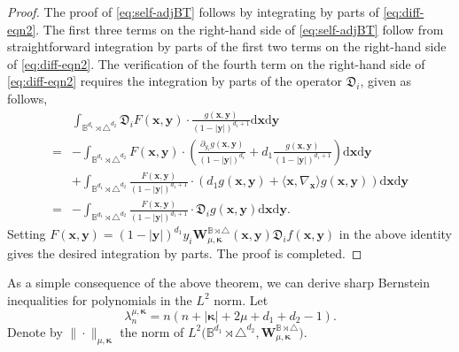 \documentclass{amsart}
\theoremstyle{remark}
\def\la{{\langle}}
\def\ra{{\rangle}}
\def\d{\mathrm{d}}
\def\fD{{\mathfrak D}}
\def\l{{\lambda}}
\def\la{{\langle}}
\def\ra{{\rangle}}
\def\BB{{\mathbb B}}
\def\VV{{\mathbb V}}
\def\bk{{\boldsymbol{\kappa}}}
\begin{document}
\begin{proof}
The proof of \eqref{eq:self-adjBT} follows by integrating by parts of \eqref{eq:diff-eqn2}. The first three terms on the right-hand side 
of \eqref{eq:self-adjBT} follow from straightforward integration by parts of the first two terms on the right-hand side of \eqref{eq:diff-eqn2}.
The verification of the fourth term on the right-hand side of \eqref{eq:diff-eqn2} requires the integration by parts of the 
operator $\fD_i$, given as follows, 
\begin{align*} 
 & \int_{\BB^{d_1} \rtimes \triangle^{d_2}}\fD_i F(\bm x,\bm y) \cdot \frac{g(\bm x,\bm y)}{(1-|\bm y|)^{d_1+1}} \d \bm x \d \bm y \\
  = & -   \int_{\BB^{d_1} \rtimes \triangle^{d_2}} F(\bm x,\bm y) \cdot \left (\frac{\partial_{y_i} g(\bm x,\bm y)}{(1-|\bm y|)^{d_1}} 
       + d_1 \frac{g(\bm x,\bm y)}{(1-|\bm y|)^{d_1+1}} \right)  \d \bm x \d \bm y  \\
 &  + \int_{\BB^{d_1} \rtimes \triangle^{d_2}} \frac{F(\bm x,\bm y)}{(1-|\bm y|)^{d_1+1}} \cdot \left (d_1 g(\bm x,\bm y) 
      + \la \bm x, \nabla_{\bm x}\ra g(\bm x,\bm y) \right)  \d \bm x \d \bm y  \\
  = & - \int_{\BB^{d_1} \rtimes \triangle^{d_2}} \frac{F(\bm x,\bm y)}{(1-|\bm y|)^{d_1+1}} \cdot \fD_i g(\bm x,\bm y) \d \bm x \d \bm y.
\end{align*}
Setting $F(\bm x, \bm y) = (1-|\bm y|)^{d_1} y_i \bm W_{\mu,\bk}^{\BB\rtimes \triangle}(\bm x, \bm y) \fD_i f(\bm x,\bm y)$ in the above 
identity gives the desired integration by parts. The proof is completed. 
\end{proof}



As a simple consequence of the above theorem, we can derive sharp Bernstein inequalities for polynomials in the 
$L^2$ norm. Let 
$$
  \l_n^{\mu,\bk} = n (n+|\bk| + 2 \mu + d_1 +d_2-1). 
$$
Denote by $\|\cdot\|_{\mu,\bk}$ the norm of $L^2\big(\BB^{d_1}\! \!\rtimes\!\triangle^{d_2}, \bm W_{\mu, \bk}^{\BB\rtimes \triangle}\big)$. 
\end{document}
